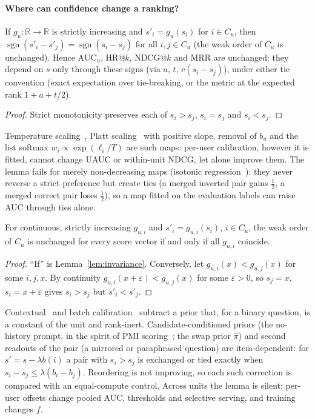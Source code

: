 \paragraph{Where can confidence change a ranking?}
\begin{lemma}[Invariance]\label{lem:invariance}\label{prop:monotone}
If $g_u:\mathbb R\to\mathbb R$ is strictly increasing and $s'_i=g_u(s_i)$ for $i\in C_u$, then
$\operatorname{sgn}(s'_i-s'_j)=\operatorname{sgn}(s_i-s_j)$ for all $i,j\in C_u$ (the weak order of $C_u$ is unchanged). Hence
$\mathrm{AUC}_u$, HR@$k$, NDCG@$k$ and MRR are unchanged: they depend on $s$ only through these signs (via $a$, $t$,
$c(s_i-s_j)$), under either tie convention (exact expectation over tie-breaking, or the metric at the expected rank
$1{+}a{+}t/2$).
\end{lemma}
\begin{proof}
Strict monotonicity preserves each of $s_i>s_j$, $s_i=s_j$ and $s_i<s_j$.
\end{proof}
Temperature scaling~\citep{guo2017calibration}, Platt scaling~\citep{platt2000probabilities} with positive slope, removal of
$b_u$ and the list softmax $w_i\propto\exp(\ell_i/T)$ are such maps: per-user calibration, however it is fitted, cannot change
UAUC or within-unit NDCG, let alone improve them. The lemma fails for merely non-decreasing maps (isotonic
regression~\citep{zadrozny2002transforming}): they never reverse a strict preference but create ties (a merged inverted pair
gains $\frac12$, a merged correct pair loses $\frac12$), so a map fitted on the evaluation labels can raise AUC through ties alone.

\begin{proposition}\label{prop:itemdep}
For continuous, strictly increasing $g_{u,i}$ and $s'_i=g_{u,i}(s_i)$, $i\in C_u$, the weak order of $C_u$ is unchanged for
every score vector if and only if all $g_{u,i}$ coincide.
\end{proposition}
\begin{proof}
``If'' is Lemma~\ref{lem:invariance}. Conversely, let $g_{u,i}(x)<g_{u,j}(x)$ for some $i,j,x$. By continuity
$g_{u,i}(x{+}\varepsilon)<g_{u,j}(x)$ for some $\varepsilon>0$, so $s_j=x$, $s_i=x{+}\varepsilon$ gives $s_i>s_j$ but
$s'_i<s'_j$.
\end{proof}
Contextual~\citep{zhao2021calibrate} and batch calibration~\citep{zhou2024batch} subtract a prior that, for a binary question,
is a constant of the unit and rank-inert. Candidate-conditioned priors (the no-history prompt, in the spirit of PMI
scoring~\citep{holtzman2021surface}; the swap prior $\hat\pi$) and second readouts of the pair (a mirrored or paraphrased
question) are item-dependent: for $s'=s-\lambda b(i)$ a pair with $s_i>s_j$ is exchanged or tied exactly when
$s_i-s_j\le\lambda(b_i-b_j)$. Reordering is not improving, so each such correction is compared with an equal-compute control.
Across units the lemma is silent: per-user offsets change pooled AUC, thresholds and selective serving, and training changes $f$.
